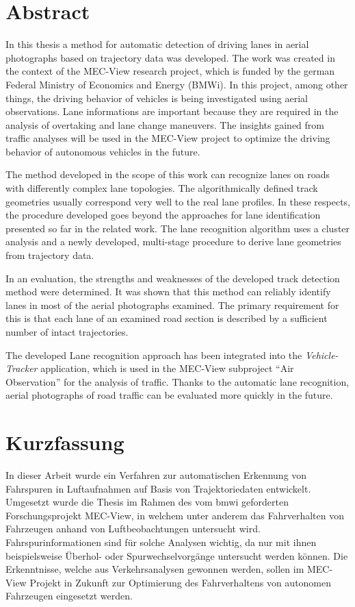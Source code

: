 
\chapter{Abstract}

In this thesis a method for automatic detection of driving lanes in aerial photographs based on trajectory data was developed.
The work was created in the context of the MEC-View research project, which is funded by the german Federal Ministry of Economics and Energy (BMWi).
In this project, among other things, the driving behavior of vehicles is being investigated using aerial observations.
Lane informations are important because they are required in the analysis of overtaking and lane change maneuvers.
The insights gained from traffic analyses will be used in the MEC-View project to optimize the
driving behavior of autonomous vehicles in the future.

The method developed in the scope of this work can recognize lanes on roads with differently complex lane topologies.
The algorithmically defined track geometries usually correspond very well to the real lane profiles.
In these respects, the procedure developed goes beyond the approaches for lane identification presented so far
in the related work.
The lane recognition algorithm uses a cluster analysis and a newly developed, multi-stage procedure to
derive lane geometries from trajectory data.

In an evaluation, the strengths and weaknesses of the developed track detection method were determined.
It was shown that this method can reliably identify lanes in most of the aerial photographs examined.
The primary requirement for this is that each lane of an examined road section is described by a sufficient
number of intact trajectories.

The developed Lane recognition approach has been integrated into the \textit{Vehicle-Tracker} application,
which is used in the MEC-View subproject ``Air Observation'' for the analysis of traffic.
Thanks to the automatic lane recognition, aerial photographs of road traffic can be evaluated more quickly in the future.

\chapter{Kurzfassung}

In dieser Arbeit wurde ein Verfahren zur automatischen Erkennung von Fahrspuren in Luftaufnahmen
auf Basis von Trajektoriedaten entwickelt. Umgesetzt wurde die Thesis im Rahmen des vom \acrshort*{bmwi}
geforderten Forschungsprojekt MEC-View, in welchem unter anderem das Fahrverhalten von Fahrzeugen
anhand von Luftbeobachtungen untersucht wird. Fahrspurinformationen sind für solche Analysen
wichtig, da nur mit ihnen beispielsweise Überhol- oder Spurwechselvorgänge untersucht werden können.
Die Erkenntnisse, welche aus Verkehrsanalysen gewonnen werden, sollen im MEC-View Projekt in
Zukunft zur Optimierung des Fahrverhaltens von autonomen Fahrzeugen eingesetzt werden.

